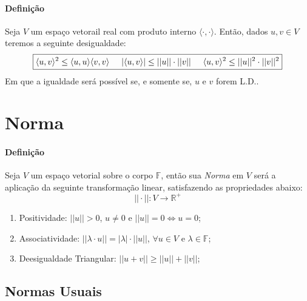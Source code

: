 \documentclass{article}
\begin{document}
            \paragraph{Definição}Seja $V$ um espaço vetorail real com produto interno $\langle\cdot,\cdot\rangle$. Então, dados $u, v \in V$ teremos a seguinte desigualdade:
                \[\boxed{
                    \langle u, v\rangle^{2} \leq \langle u, u\rangle\langle v, v\rangle \hspace{5mm}
                    |\langle u, v\rangle| \leq ||u||\cdot||v|| \hspace{5mm}
                    \langle u, v\rangle^{2} \leq ||u||^{2}\cdot||v||^{2}}\]
            Em que a igualdade será possível se, e somente se, $u$ e $v$ forem L.D..
\newpage

    \section{Norma}
        \paragraph{Definição}Seja $V$ um espaço vetorial sobre o corpo $\mathbb{F}$, então sua \textit{Norma} em $V$ será a aplicação da seguinte transformação linear, satisfazendo as propriedades abaixo:
            \[\boxed{||\cdot||: V \rightarrow \mathbb{R}^{+}}\]
            \begin{enumerate}[noitemsep]
                \item Positividade: $||u||>0$, $u \neq 0$ e $||u|| = 0 \iff u = 0$;
                \item Associatividade: $||\lambda \cdot u|| = |\lambda|\cdot||u||$, $\forall u \in V$ e $\lambda \in \mathbb{F}$;
                \item Deesigualdade Triangular: $||u + v|| \geq ||u|| + ||v||$;
            \end{enumerate}

        \subsection{Normas Usuais}
\end{document}
